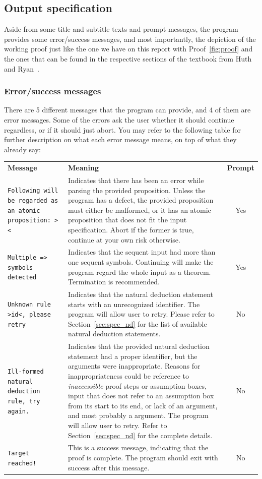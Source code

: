 \documentclass[12pt]{article}
\begin{document}
\subsection{Output specification}

Aside from some title and subtitle texts and prompt messages, the program
provides some error/success messages, and most importantly, the depiction of the
working proof just like the one we have on this report with Proof~\ref{fig:proof}
and the ones that can be found in the respective sections of the textbook
from Huth and Ryan~\cite{huth2004logic}.

\subsubsection{Error/success messages}

There are 5 different messages that the program can provide,
and 4 of them are error messages. Some of the errors ask the
user whether it should continue regardless, or if it should
just abort. You may refer to the following table for further
description on what each error message means, on top of what
they already say:

\begin{center}
	\begin{tabular}{p{8em}p{25em}c}
		\textbf{Message} & \textbf{Meaning} & \textbf{Prompt}\\
		\texttt{Following will be regarded as an atomic proposition: >\AF{}<} &
		Indicates that there has been an error while parsing the provided
		proposition. Unless the program has a defect, the provided proposition
		must either be malformed, or it has an atomic proposition that
		does not fit the input specification. Abort if the former is true,
		continue at your own risk otherwise. &
		Yes\\
		\texttt{Multiple => symbols detected} &
		Indicates that the sequent input had more than one sequent symbols.
		Continuing will make the program regard the whole input as a theorem.
		Termination is recommended. &
		Yes\\
		\texttt{Unknown rule >id<, please retry} &
		Indicates that the natural deduction statement starts with an
		unrecognized identifier. The program will allow user to retry.
		Please refer to Section~\ref{sec:spec_nd} for the list of
		available natural deduction statements. &
		No\\
		\texttt{Ill-formed natural deduction rule, try again.} &
		Indicates that the provided natural deduction statement had a proper
		identifier, but the arguments were inappropriate. Reasons for
		inappropriateness could be reference to \textit{inaccessible}
		proof steps or assumption boxes, \AR{} input that does not refer
		to an assumption box from its start to its end, or lack of an argument,
		and most probably a \AF{} argument. The program will allow user to
		retry. Refer to Section~\ref{sec:spec_nd} for the complete details. &
		No\\
		\texttt{Target reached!} &
		This is a success message, indicating that the proof is complete.
		The program should exit with success after this message.
		&
		No
	\end{tabular}
\end{center}
\end{document}
